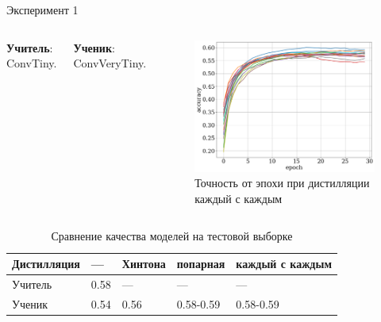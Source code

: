 \documentclass{beamer}
\begin{document}

\begin{frame}{Эксперимент 1}
    \begin{columns}[c]
        \textbf{Учитель}: ConvTiny.

        \textbf{Ученик}: ConvVeryTiny.


        \begin{figure}
            \includegraphics[width=1.0\textwidth]{distill_epoch_accuracy.png}
            \caption{Точность от эпохи при дистилляции каждый с каждым}
        \end{figure}
    \end{columns}

    \begin{table}[]
        \begin{tabular}{|l|l|l|l|l|}
            \hline
            Дистилляция & ---  & Хинтона & попарная  & каждый с каждым \\ \hline
            Учитель     & 0.58 & ---     & ---       & ---             \\ \hline
            Ученик      & 0.54 & 0.56    & 0.58-0.59 & 0.58-0.59       \\ \hline
        \end{tabular}
        \caption{Сравнение качества моделей на тестовой выборке}
    \end{table}
\end{frame}

\end{document}
